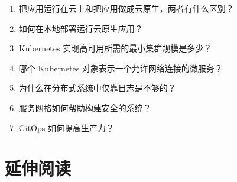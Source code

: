 \begin{enumerate}
\item 把应用运行在云上和把应用做成云原生，两者有什么区别？
\item 如何在本地部署运行云原生应用？
\item Kubernetes 实现高可用所需的最小集群规模是多少？
\item 哪个 Kubernetes 对象表示一个允许网络连接的微服务？
\item 为什么在分布式系统中仅靠日志是不够的？
\item 服务网格如何帮助构建安全的系统？
\item GitOps 如何提高生产力？
\end{enumerate}

\section{延伸阅读}

